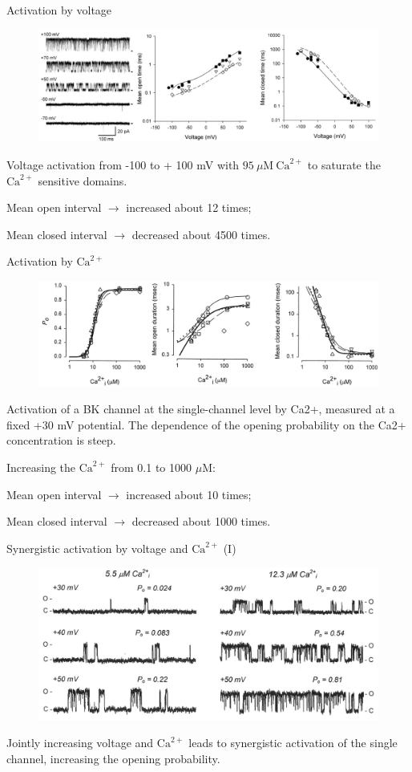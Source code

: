 \documentclass{beamer}
\newcommand{\ca}{\text{Ca}^{2+}}
\begin{document}
\begin{frame}{Activation by voltage}
\begin{figure}
\centering
\includegraphics[width=\textwidth]{Voltage_Opening.png}
\end{figure}
Voltage activation from -100 to + 100 mV with $95\ \mu\text{M}\ \ca$ to saturate the $\ca$ sensitive domains.

Mean open interval $\rightarrow$ increased about 12 times;

Mean closed interval $\rightarrow$ decreased about 4500 times.
\vfill
\end{frame}

\begin{frame}{Activation by $\ca$}
\begin{figure}
\centering
\includegraphics[width=\textwidth]{Ca_activation_1.png}
\end{figure}
Activation of a BK channel at the single-channel level by Ca2+, measured at a fixed +30 mV potential.
The dependence of the opening probability on the Ca2+ concentration is steep.

Increasing the $\ca$ from 0.1 to 1000 $\mu\text{M}:$

Mean open interval $\rightarrow$ increased about 10 times;

Mean closed interval $\rightarrow$ decreased about 1000 times.
\vfill
\end{frame}

\begin{frame}{Synergistic activation by voltage and $\ca$ (I)}
\begin{figure}
\centering
\includegraphics[width=.8\textwidth]{Synergistic_activation_1.png}
\end{figure}
\bigskip
Jointly increasing voltage and $\ca$ leads to synergistic activation of the single channel, increasing the opening probability.
\end{frame}
\end{document}
